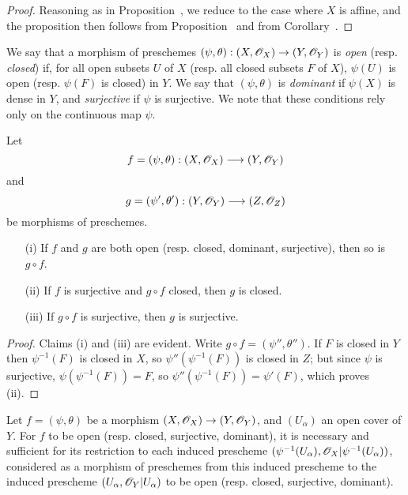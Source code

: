 \begin{proof}
\label{proof-I.2.2.5}
Reasoning as in Proposition~, we reduce to the case where $X$ is affine, and the proposition then follows from Proposition~ and from Corollary~.
\end{proof}

\begin{env}[2.2.6]
\label{I.2.2.6}
We say that a morphism of preschemes $(\psi,\theta):(X,\sh{O}_X)\to(Y,\sh{O}_Y)$ is \emph{open} (resp. \emph{closed}) if, for all open subsets $U$ of $X$ (resp. all closed subsets $F$ of $X$), $\psi(U)$ is open (resp. $\psi(F)$ is closed) in $Y$.
We say that $(\psi,\theta)$ is \emph{dominant} if $\psi(X)$ is dense in $Y$, and \emph{surjective} if $\psi$ is surjective.
We note that these conditions rely only on the continuous map $\psi$.
\end{env}

\begin{proposition}[2.2.7]
\label{I.2.2.7}
Let
\[
  f=(\psi,\theta):(X,\sh{O}_X)\to(Y,\sh{O}_Y)
\]
and
\[
  g=(\psi',\theta'):(Y,\sh{O}_Y)\to(Z,\sh{O}_Z)
\]
be morphisms of preschemes.
\begin{enumerate}
  \item[{\rm(i)}] If $f$ and $g$ are both open (resp. closed, dominant, surjective),
    then so is $g\circ f$.
  \item[{\rm(ii)}] If $f$ is surjective and $g\circ f$ closed, then $g$ is closed.
  \item[{\rm(iii)}] If $g\circ f$ is surjective, then $g$ is surjective.
\end{enumerate}
\end{proposition}

\begin{proof}
\label{proof-I.2.2.7}
Claims (i) and (iii) are evident.
Write $g\circ f=(\psi'',\theta'')$.
If $F$ is closed in $Y$ then $\psi^{-1}(F)$ is closed in $X$, so $\psi''(\psi^{-1}(F))$ is closed in $Z$;
but since $\psi$ is surjective, $\psi(\psi^{-1}(F))=F$, so $\psi''(\psi^{-1}(F))=\psi'(F)$, which proves (ii).
\end{proof}

\begin{proposition}[2.2.8]
\label{I.2.2.8}
Let $f=(\psi,\theta)$ be a morphism $(X,\sh{O}_X)\to(Y,\sh{O}_Y)$, and $(U_\alpha)$ an open cover of $Y$.
For $f$ to be open (resp. closed, surjective, dominant), it is necessary and sufficient for its restriction to each induced prescheme $(\psi^{-1}(U_\alpha),\mathscr{O}_X|\psi^{-1}(U_\alpha))$, considered as a morphism of preschemes from this induced prescheme to the induced prescheme $(U_\alpha,\mathscr{O}_Y|U_\alpha)$ to be open (resp. closed, surjective, dominant).
\end{proposition}

